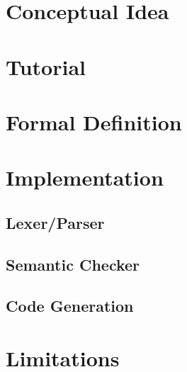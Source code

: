 \section{Conceptual Idea}

\section{Tutorial}

\section{Formal Definition}

\section{Implementation}

\subsection{Lexer/Parser}

\subsection{Semantic Checker}

\subsection{Code Generation}

\section{Limitations}